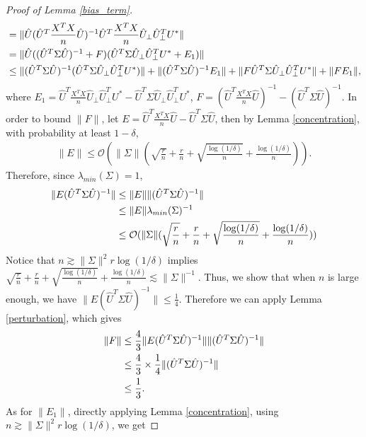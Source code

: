 \begin{proof}[Proof of Lemma \ref{bias_term}]
\begin{align}
& = \|\hat{U}(\hat{U}^{T}\frac{X^{T}X}{n}\hat{U})^{-1}\hat{U}^{T}\frac{X^{T}X}{n}\hat{U}_{\perp}\hat{U}_{\perp}^{T}U^{*}\| \notag \\ 
& = \|\hat{U}((\hat{U}^{T}\Sigma\hat{U})^{-1}+F)(\hat{U}^{T}\Sigma\hat{U}_{\perp}\hat{U}_{\perp}^{T}U^{*}+E_{1})\| \notag \\ 
& \leq \|(\hat{U}^{T}\Sigma\hat{U})^{-1}(\hat{U}^{T}\Sigma\hat{U}_{\perp}\hat{U}_{\perp}^{T}U^{*})\|+\|(\hat{U}^{T}\Sigma\hat{U})^{-1}E_{1}\|+ \|F\hat{U}^{T}\Sigma\hat{U}_{\perp}\hat{U}_{\perp}^{T}U^{*}\| + \|FE_{1}\|,
\end{align}
where $E_{1}=\hat{U}^{T}\frac{X^{T}X}{n}\hat{U}_{\perp}\hat{U}_{\perp}^{T}U^{*} - \hat{U}^{T}\Sigma\hat{U}_{\perp}\hat{U}_{\perp}^{T}U^{*}$, $F =(\hat{U}^{T}\frac{X^{T}X}{n}\hat{U})^{-1} -(\hat{U}^{T}\Sigma\hat{U})^{-1}$. In order to bound $\|F\|$, let $E=\hat{U}^{T}\frac{X^{T}X}{n}\hat{U} -\hat{U}^{T}\Sigma\hat{U}$, then by Lemma \ref{concentration}, with probability at least $1-\delta$, \begin{align}
\|E\|\leq \mathcal{O}(\|\Sigma\|(\sqrt{\frac{r}{n}}+ \frac{r}{n} +\sqrt{ \frac{\log(1/\delta)}{n}}+ \frac{\log(1/\delta)}{n})).    
\end{align}
Therefore, since $\lambda_{min}(\Sigma)=1$,
\begin{align}
\|E(\hat{U}^{T}\Sigma\hat{U})^{-1}\| &\leq \|E\|  \|(\hat{U}^{T}\Sigma\hat{U})^{-1}\|   \notag \\
& \leq \|E\| \lambda_{min}(\Sigma)^{-1}\notag \\
& \leq \mathcal{O}(\|\Sigma\|(\sqrt{\frac{r}{n}}+ \frac{r}{n} +\sqrt{ \frac{\log(1/\delta)}{n}}+ \frac{\log(1/\delta)}{n}))
\end{align}
Notice that $n \gtrsim \|\Sigma\|^{2} r \log (1/\delta)$ implies $\sqrt{\frac{r}{n}}+ \frac{r}{n} +\sqrt{ \frac{\log(1/\delta)}{n}}+ \frac{\log(1/\delta)}{n}\lesssim \|\Sigma\|^{-1}$. Thus, we show that when $n$ is large enough, we have $\|E(\hat{U}^{T}\Sigma\hat{U})^{-1}\| \leq \frac{1}{4}$. Therefore we can apply Lemma \ref{perturbation}, which gives 
\begin{align} \label{F}
\|F\| &\leq \frac{4}{3} \|E(\hat{U}^{T}\Sigma\hat{U})^{-1}\|  \|(\hat{U}^{T}\Sigma\hat{U})^{-1}\|   \notag \\
&\leq \frac{4}{3} \times \frac{1}{4} \|(\hat{U}^{T}\Sigma\hat{U})^{-1}\| \notag \\
&\leq \frac{1}{3}.
\end{align}
As for $\|E_{1}\|$, directly applying Lemma \ref{concentration}, using $n \gtrsim \|\Sigma\|^{2} r \log (1/\delta)$, we get 

\end{proof}
